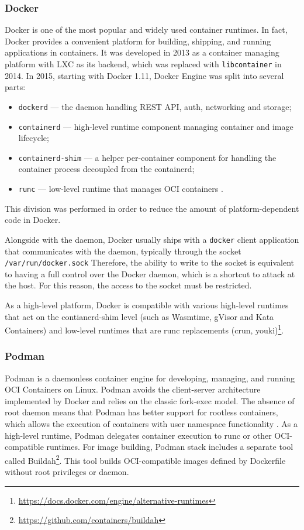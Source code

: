 \subsubsection*{Docker}

Docker is one of the most popular and widely used container runtimes. In fact, Docker provides a convenient platform for building, shipping, and running applications in containers. It was developed in 2013 as a container managing platform with LXC as its backend, which was replaced with \texttt{libcontainer} in 2014. In 2015, starting with Docker 1.11, Docker Engine was split into several parts:

\begin{itemize}
  \item \texttt{dockerd} — the daemon handling REST API, auth, networking and storage;
  \item \texttt{containerd} — high-level runtime component managing container and image lifecycle;
  \item \texttt{containerd-shim} — a helper per-container component for handling the container process decoupled from the containerd;
  \item \texttt{runc} — low-level runtime that manages OCI containers \cite{acm:1}.
\end{itemize}

This division was performed in order to reduce the amount of platform-dependent code in Docker.

Alongside with the daemon, Docker usually ships with a \texttt{docker} client application that communicates with the daemon, typically through the socket \texttt{/var/run/docker.sock} \cite{book:docker} Therefore, the ability to write to the socket is equivalent to having a full control over the Docker daemon, which is a shortcut to attack at the host. For this reason, the access to the socket must be restricted.

As a high-level platform, Docker is compatible with various high-level runtimes that act on the contianerd-shim level (such as Wasmtime, gVisor and Kata Containers) and low-level runtimes that are runc replacements (crun, youki)\footnote{\url{https://docs.docker.com/engine/alternative-runtimes}}.

\subsubsection*{Podman}

Podman is a daemonless container engine for developing, managing, and running OCI Containers on Linux. Podman avoids the client-server architecture implemented by Docker and relies on the classic fork-exec model. The absence of root daemon means that Podman has better support for rootless containers, which allows the execution of containers with user namespace functionality \cite{acm:2}. As a high-level runtime, Podman delegates container execution to runc or other OCI-compatible runtimes. For image building, Podman stack includes a separate tool called Buildah\footnote{\url{https://github.com/containers/buildah}}. This tool builds OCI-compatible images defined by Dockerfile without root privileges or daemon.

